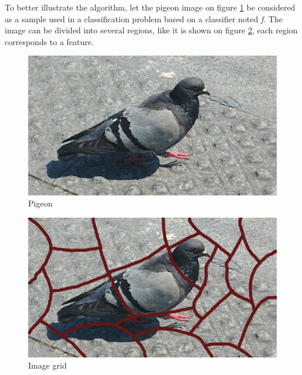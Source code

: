 To better illustrate the algorithm, let the pigeon image on figure \ref{fig:limepigeon} be considered as a sample used in a classification problem based on a classifier noted \textit{f}. The image can be divided into several regions, like it is shown on figure \ref{fig:limediv}, each region corresponds to a feature.

\begin{minipage}{.45\textwidth}
    \begin{figure}[H]
        \centering
        \includegraphics[width=\linewidth]{images/lime/pigeon}
        \caption{Pigeon}
        \label{fig:limepigeon}
    \end{figure}
\end{minipage}
\begin{minipage}{.45\textwidth}
    \begin{figure}[H]
        \centering
        \includegraphics[width=\linewidth]{images/lime/grid}
        \caption{Image grid}
        \label{fig:limediv}
    \end{figure}
\end{minipage}
\vspace{0.5cm}


